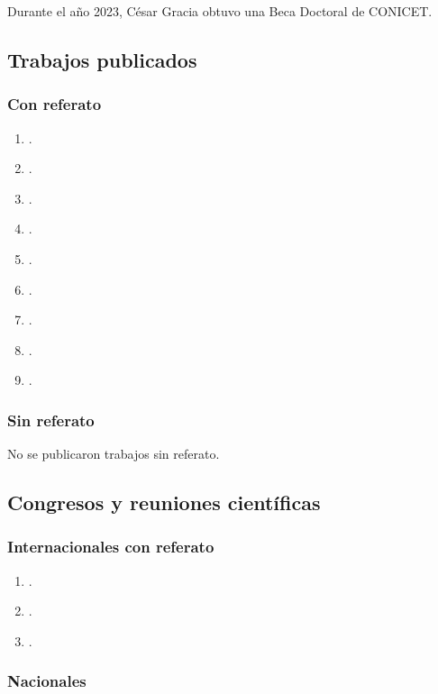 \documentclass[a4paper,11pt,twoside,final,titlepage,onecolumn,openright]{report}
\begin{document}
Durante el año 2023, César Gracia obtuvo una Beca Doctoral de CONICET.

\subsection{Trabajos publicados}

\subsubsection{Con referato}

\begin{enumerate}
    \item {}.
    \item {}.
    \item {}.
    \item {}.
    \item {}.
    \item {}.
    \item {}.
    \item {}.
    \item {}.
\end{enumerate}

\subsubsection{Sin referato}
No se publicaron trabajos sin referato.

\subsection{Congresos y reuniones científicas}

\subsubsection{Internacionales con referato}
\begin{enumerate}
    \item {}.
    \item {}.
    \item {}.
\end{enumerate}

\subsubsection{Nacionales}
\end{document}
